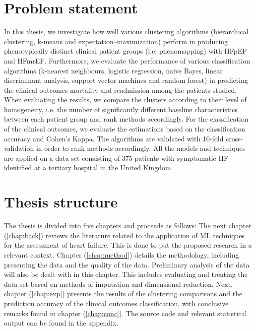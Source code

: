 \documentclass[../thesis.tex]{subfiles}
\begin{document}
\section{Problem statement}
\label{sec:prob_stat}

\noindent In this thesis, we investigate how well various clustering algorithms (hierarchical clustering, k-means and expectation–maximization) perform in producing phenotypically distinct clinical patient groups (i.e. phenomapping) with HFpEF and HFmrEF. Furthermore, we evaluate the performance of various classification algorithms (k-nearest neighbours, logistic regression, naive Bayes, linear discriminant analysis, support vector machines and random forest) in predicting the clinical outcomes mortality and readmission among the patients studied. When evaluating the results, we compare the clusters according to their level of homogeneity, i.e. the number of significantly different baseline characteristics between each patient group and rank methods accordingly. For the classification of the clinical outcomes, we evaluate the estimations based on the classification accuracy and Cohen's Kappa. The algorithms are validated with 10-fold cross-validation in order to rank methods accordingly. All the models and techniques are applied on a data set consisting of 375 patients with symptomatic HF identified at a tertiary hospital in the United Kingdom.  

\section{Thesis structure}
\label{sec:thesis_struc}

\noindent The thesis is divided into five chapters and proceeds as follows: The next chapter (\ref{chap:back}) reviews the literature related to the application of ML techniques for the assessment of heart failure. This is done to put the proposed research in a relevant context. Chapter (\ref{chap:method}) details the methodology, including presenting the data and the quality of the data. Preliminary analysis of the data will also be dealt with in this chapter. This includes evaluating and treating the data set based on methods of imputation and dimensional reduction. Next, chapter (\ref{chap:exp}) presents the results of the clustering comparisons and the prediction accuracy of the clinical outcomes classification, with conclusive remarks found in chapter (\ref{chap:conc}). The source code and relevant statistical output can be found in the appendix.
\end{document}
